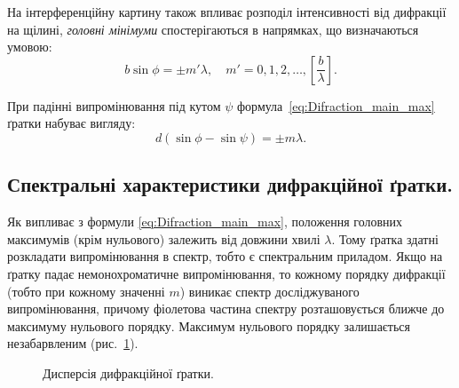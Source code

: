 На інтерференційну картину також впливає розподіл інтенсивності від дифракції на щілині, \emph{головні мінімуми} спостерігаються в напрямках, що визначаються умовою:
\begin{equation}\label{eq:Difraction_main_min}
    b\sin\phi= \pm m'\lambda, \quad m' = 0, 1, 2, \ldots, \left[ \frac{b}{\lambda}\right].
\end{equation}

При падінні випромінювання під кутом $ \psi $ формула~\eqref{eq:Difraction_main_max} ґратки набуває вигляду:
\begin{equation}\label{key}
    d(\sin\phi - \sin\psi) = \pm m \lambda.
\end{equation}

\subsection*{Спектральні характеристики дифракційної ґратки.}

Як випливає з формули \eqref{eq:Difraction_main_max}, положення головних максимумів (крім нульового) залежить від довжини хвилі $\lambda$. Тому ґратка здатні розкладати випромінювання в спектр, тобто є спектральним приладом. Якщо на ґратку падає немонохроматичне випромінювання, то кожному порядку дифракції (тобто при кожному значенні $m$) виникає спектр досліджуваного випромінювання, причому фіолетова частина спектру розташовується ближче до максимуму нульового порядку. Максимум нульового порядку залишається незабарвленим (рис.~\ref{pic:slotd_dispersion}).



\begin{figure}[h!]\centering
    
    \caption{Дисперсія дифракційної ґратки.}
    \label{pic:slotd_dispersion}
\end{figure}

